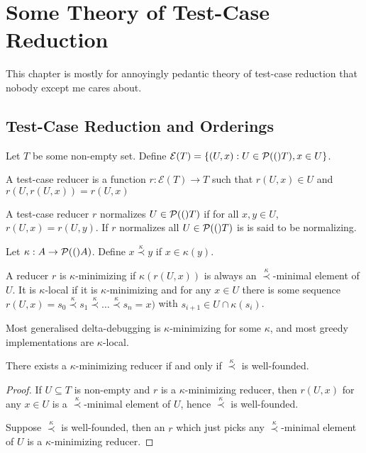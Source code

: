 \chapter{Some Theory of Test-Case Reduction}

This chapter is mostly for annoyingly pedantic theory of test-case reduction that nobody except me cares about.

\section{Test-Case Reduction and Orderings}

\newcommand{\exemplars}[1]{\mathcal{E}(#1)}

Let \(T\) be some non-empty set.
Define \(\exemplars{T} = \{ (U, x) : U \in \pow(T), x \in U \}\).

\begin{definition}
A test-case reducer is a function \(r: \exemplars{T} \to T\) such that \(r(U, x) \in U\) and \(r(U, r(U, x)) = r(U, x)\)
\end{definition}

\begin{definition}
A test-case reducer \(r\) normalizes \(U \in \mathcal{P}(()T)\) if for all \(x, y \in U\), \(r(U, x) = r(U, y)\).
If \(r\) normalizes all \(U \in \mathcal{P}(()T)\) is is said to be normalizing.
\end{definition}


\newcommand{\preckap}{\stackrel{\kappa}{\prec}}

\begin{definition}
Let \(\kappa: A \to \mathcal{P}(()A)\).
Define \(x \preckap y\) if \(x \in \kappa(y)\).

A reducer \(r\) is \(\kappa\)-minimizing if \(\kappa(r(U, x))\) is always an \(\preckap\)-minimal element of \(U\).
It is \(\kappa\)-local if it is \(\kappa\)-minimizing and for any \(x \in U\) there is some sequence \(r(U, x) = s_0 \preckap s_1 \preckap \ldots \preckap s_n = x)\) with \(s_{i + 1} \in U \cap \kappa(s_i)\).
\end{definition}

Most generalised delta-debugging is \(\kappa\)-minimizing for some \(\kappa\),
and most greedy implementations are \(\kappa\)-local.

\begin{proposition}
There exists a \(\kappa\)-minimizing reducer if and only if \(\preckap\) is well-founded.
\end{proposition}

\begin{proof}
If \(U \subseteq T\) is non-empty and \(r\) is a \(\kappa\)-minimizing reducer,
then \(r(U, x)\) for any \(x \in U\) is a \(\preckap\)-minimal element of \(U\),
hence \(\preckap\) is well-founded.

Suppose \(\preckap\) is well-founded,
then an \(r\) which just picks any \(\preckap\)-minimal element of \(U\) is a \(\kappa\)-minimizing reducer.
\end{proof}

